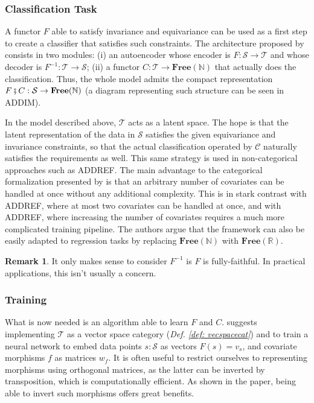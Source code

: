 \documentclass[11pt,a4paper,openright,twoside]{report}
\theoremstyle{plain}
\theoremstyle{definition}
\newtheorem{remark}[proposition]{Remark}
\begin{document}
\subsubsection{Classification Task}


A functor $F$ able to satisfy invariance and equivariance can be used as a first step to create a classifier that satisfies such constraints. The architecture proposed by \cite{chytas2024poolingimagedatasetsmultiple} consists in two modules: (i) an autoencoder whose encoder is $F: \mathcal{S} \to \mathcal{T}$ and whose decoder is $F^{-1}: \mathcal{T} \to \mathcal{S}$; (ii) a functor $C: \mathcal{T} \to \mathbf{Free}(\mathbb{N})$ that actually does the classification. Thus, the whole model admits the compact representation $F \fatsemi C: \mathcal{S} \to \mathbf{Free}(\mathbb{N})$ (a diagram representing such structure can be seen in ADDIM).


In the model described above, $\mathcal{T}$ acts as a latent space. The hope is that the latent representation of the data in $\mathcal{S}$ satisfies the given equivariance and invariance constraints, so that the actual classification operated by $\mathcal{C}$ naturally satisfies the requirements as well.
This same strategy is used in non-categorical approaches such as ADDREF. The main advantage to the categorical formalization presented by \cite{chytas2024poolingimagedatasetsmultiple} is that an arbitrary number of covariates can be handled at once without any additional complexity. This is in stark contrast with ADDREF, where at most two covariates can be handled at once, and with ADDREF, where increasing the number of covariates requires a much more complicated training pipeline. The authors argue that the framework can also be easily adapted to regression tasks by replacing $\mathbf{Free}(\mathbb{N})$ with $\mathbf{Free}(\mathbb{R})$.

\begin{remark}
  It only makes sense to consider $F^{-1}$ is $F$ is fully-faithful. In practical applications, this isn't usually a concern.
\end{remark}


\subsubsection{Training}

What is now needed is an algorithm able to learn $F$ and $C$. \cite{chytas2024poolingimagedatasetsmultiple} suggests implementing $\mathcal{T}$ as a vector space category (\textit{Def. \ref{def: vecspacecat}}) and to train a neural network to embed data points $s : \mathcal{S}$ as vectors $F(s) = v_s$, and covariate morphisms $f$ as matrices $w_f$. It is often useful to restrict ourselves to representing morphisms using orthogonal matrices, as the latter can be inverted by transposition, which is computationally efficient. As shown in the paper, being able to invert such morphisms offers great benefits.
\end{document}
